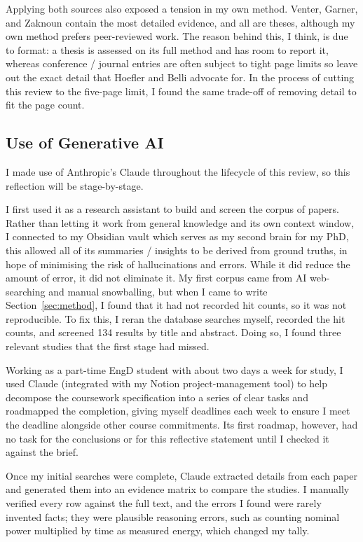 Applying both sources also exposed a tension in my own method. Venter, Garner, and Zaknoun contain the most detailed evidence, and all are theses, although my own method prefers peer-reviewed work. The reason behind this, I think, is due to format: a thesis is assessed on its full method and has room to report it, whereas conference / journal entries are often subject to tight page limits so leave out the exact detail that Hoefler and Belli advocate for. In the process of cutting this review to the five-page limit, I found the same trade-off of removing detail to fit the page count.


\subsection{Use of Generative AI}

I made use of Anthropic's Claude throughout the lifecycle of this review, so this reflection will be stage-by-stage.

I first used it as a research assistant to build and screen the corpus of papers. Rather than letting it work from general knowledge and its own context window, I connected to my Obsidian vault which serves as my second brain for my PhD, this allowed all of its summaries / insights to be derived from ground truths, in hope of minimising the risk of hallucinations and errors. While it did reduce the amount of error, it did not eliminate it. My first corpus came from AI web-searching and manual snowballing, but when I came to write Section~\ref{sec:method}, I found that it had not recorded hit counts, so it was not reproducible.
To fix this, I reran the database searches myself, recorded the hit counts,
and screened 134 results by title and abstract.
Doing so, I found three relevant studies that the first stage had missed.

Working as a part-time EngD student with about two days a week for study, I used Claude (integrated with my Notion project-management tool) to help decompose the coursework specification into a series of clear tasks and roadmapped the completion, giving myself deadlines each week to ensure I meet the deadline alongside other course commitments.
Its first roadmap, however, had no task for the conclusions or for this reflective statement until I checked it against the brief.

Once my initial searches were complete, Claude extracted details from each paper and generated them into an evidence matrix to compare the studies.
I manually verified every row against the full text,
and the errors I found were rarely invented facts; they were plausible reasoning errors,
such as counting nominal power multiplied by time as measured energy, which changed my tally.

